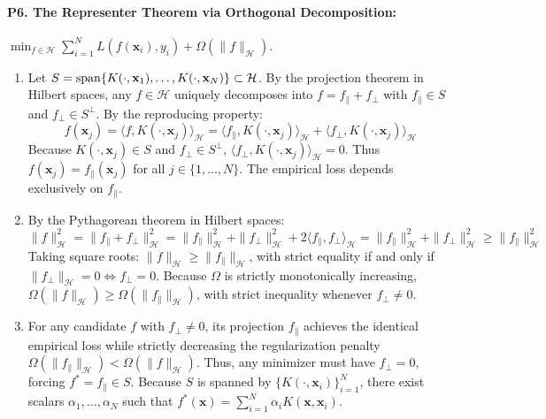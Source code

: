 \paragraph{P6. The Representer Theorem via Orthogonal Decomposition:}
$\min_{f \in \mathcal{H}} \sum_{i=1}^N L(f(\mathbf{x}_i), y_i) + \Omega(\|f\|_{\mathcal{H}})$.
\begin{enumerate}[label=(\alph*)]
    \item Let $S = \operatorname{span}\{K(\cdot, \mathbf{x}_1), \dots, K(\cdot, \mathbf{x}_N)\} \subset \mathcal{H}$. By the projection theorem in Hilbert spaces, any $f \in \mathcal{H}$ uniquely decomposes into $f = f_{\|} + f_{\perp}$ with $f_{\|} \in S$ and $f_{\perp} \in S^\perp$.
    By the reproducing property:
    \begin{equation*}
    f(\mathbf{x}_j) = \langle f, K(\cdot, \mathbf{x}_j) \rangle_{\mathcal{H}} = \langle f_{\|}, K(\cdot, \mathbf{x}_j) \rangle_{\mathcal{H}} + \langle f_{\perp}, K(\cdot, \mathbf{x}_j) \rangle_{\mathcal{H}}
    \end{equation*}
    Because $K(\cdot, \mathbf{x}_j) \in S$ and $f_{\perp} \in S^\perp$, $\langle f_{\perp}, K(\cdot, \mathbf{x}_j) \rangle_{\mathcal{H}} = 0$.
    Thus $f(\mathbf{x}_j) = f_{\|}(\mathbf{x}_j)$ for all $j \in \{1, \dots, N\}$. The empirical loss depends exclusively on $f_{\|}$.
    \item By the Pythagorean theorem in Hilbert spaces:
    \begin{equation*}
    \|f\|_{\mathcal{H}}^2 = \|f_{\|} + f_{\perp}\|_{\mathcal{H}}^2 = \|f_{\|}\|_{\mathcal{H}}^2 + \|f_{\perp}\|_{\mathcal{H}}^2 + 2\langle f_{\|}, f_{\perp} \rangle_{\mathcal{H}} = \|f_{\|}\|_{\mathcal{H}}^2 + \|f_{\perp}\|_{\mathcal{H}}^2 \ge \|f_{\|}\|_{\mathcal{H}}^2
    \end{equation*}
    Taking square roots: $\|f\|_{\mathcal{H}} \ge \|f_{\|}\|_{\mathcal{H}}$, with strict equality if and only if $\|f_{\perp}\|_{\mathcal{H}} = 0 \iff f_{\perp} = 0$.
    Because $\Omega$ is strictly monotonically increasing, $\Omega(\|f\|_{\mathcal{H}}) \ge \Omega(\|f_{\|}\|_{\mathcal{H}})$, with strict inequality whenever $f_{\perp} \ne 0$.
    \item For any candidate $f$ with $f_{\perp} \ne 0$, its projection $f_{\|}$ achieves the identical empirical loss while strictly decreasing the regularization penalty $\Omega(\|f_{\|}\|_{\mathcal{H}}) < \Omega(\|f\|_{\mathcal{H}})$. Thus, any minimizer must have $f_{\perp} = 0$, forcing $f^* = f_{\|} \in S$. Because $S$ is spanned by $\{K(\cdot, \mathbf{x}_i)\}_{i=1}^N$, there exist scalars $\alpha_1, \dots, \alpha_N$ such that $f^*(\mathbf{x}) = \sum_{i=1}^N \alpha_i K(\mathbf{x}, \mathbf{x}_i)$.
\end{enumerate}

